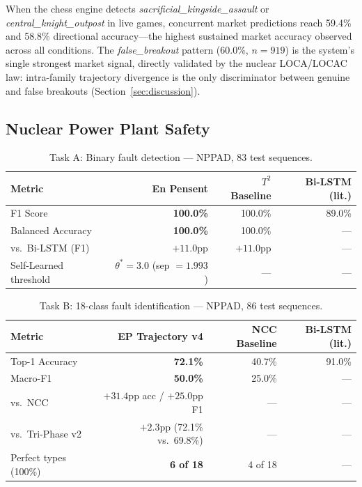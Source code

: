 \documentclass[12pt,a4paper]{article}
\begin{document}
When the chess engine detects \textit{sacrificial\_kingside\_assault} or
\textit{central\_knight\_outpost} in live games, concurrent market predictions reach 59.4\% and
58.8\% directional accuracy---the highest sustained market accuracy observed across all conditions.
The \textit{false\_breakout} pattern (60.0\%, $n{=}919$) is the system's single strongest market
signal, directly validated by the nuclear LOCA/LOCAC law: intra-family trajectory divergence is
the only discriminator between genuine and false breakouts (Section~\ref{sec:discussion}).

\subsection{Nuclear Power Plant Safety}

\begin{table}[H]
\centering
\caption{Task A: Binary fault detection --- NPPAD, 83 test sequences.}
\label{tab:nuke_a}
\begin{tabular}{lrrr}
\toprule
\textbf{Metric} & \textbf{En Pensent} & \boldmath$T^2$ \textbf{Baseline} & \textbf{Bi-LSTM (lit.)} \\
\midrule
F1 Score         & \textbf{100.0\%} & 100.0\% & 89.0\% \\
Balanced Accuracy & \textbf{100.0\%} & 100.0\% & --- \\
vs.\ Bi-LSTM (F1) & $+11.0$pp & $+11.0$pp & --- \\
Self-Learned threshold & $\theta^*{=}3.0$ (sep $= 1.993$) & --- & --- \\
\bottomrule
\end{tabular}
\end{table}

\begin{table}[H]
\centering
\caption{Task B: 18-class fault identification --- NPPAD, 86 test sequences.}
\label{tab:nuke_b}
\begin{tabular}{lrrr}
\toprule
\textbf{Metric} & \textbf{EP Trajectory v4} & \textbf{NCC Baseline} & \textbf{Bi-LSTM (lit.)} \\
\midrule
Top-1 Accuracy   & \textbf{72.1\%} & 40.7\% & 91.0\% \\
Macro-F1         & \textbf{50.0\%} & 25.0\% & --- \\
vs.\ NCC         & $+31.4$pp acc / $+25.0$pp F1 & --- & --- \\
vs.\ Tri-Phase v2 & $+2.3$pp (72.1\% vs.\ 69.8\%) & --- & --- \\
Perfect types (100\%) & \textbf{6 of 18} & 4 of 18 & --- \\
\bottomrule
\end{tabular}
\end{table}
\end{document}
